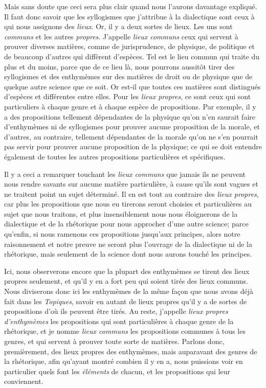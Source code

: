 Mais sans doute que ceci sera plus clair quand nous l'aurons davantage expliqué. Il faut donc savoir que les syllogismes que j'attribue à la dialectique
sont ceux à qui nous assignons des \emph{lieux}. Or, il y a deux sortes de lieux. Les uns sont \emph{communs} et les autres \emph{propres}. J'appelle
\emph{lieux communs} ceux qui servent à prouver diverses matières, comme de jurisprudence, de physique, de politique et de beaucoup d'autres qui diffèrent
d'espèces. Tel est le lieu commun qui traite du plus et du moins, parce que de ce lieu là, nous pourrons aussitôt tirer des syllogismes et des enthymèmes
sur des matières de droit ou de physique que de quelque autre science que ce soit. Or est-il que toutes ces matières sont distingués d'espèces et
différentes entre elles. Pour les \emph{lieux propres}, ce sont ceux qui sont particuliers à chaque genre et à chaque espèce de propositions. Par exemple,
il y a des propositions tellement dépendantes de la physique qu'on n'en saurait faire d'enthymèmes ni de syllogismes pour prouver aucune proposition de la
morale, et d'autres, au contraire, tellement dépendantes de la morale qu'on ne s'en pourrait pas servir pour prouver aucune proposition de la physique; ce
qui se doit entendre également de toutes les autres propositions particulières et spécifiques.

\bigbreak

Il y a ceci a remarquer touchant les \emph{lieux communs} que jamais ils ne peuvent nous rendre savants sur aucune matière particulière, à cause qu'ils
sont vagues et ne traitent point un sujet déterminé. Il en est tout au contraire des \emph{lieux propres}, car plus les propositions que nous eu tirerons
seront choisies et particulières au sujet que nous traitons, et plus insensiblement nous nous éloignerons de la dialectique et de la rhétorique pour nous
approcher d'une autre science; parce qu'enfin, si nous ramenons ces propositions jusqu'aux principes, alors notre raisonnement et notre preuve ne seront
plus l'ouvrage de la dialectique ni de la rhétorique, mais seulement de la science dont nous aurons touché les principes. 

Ici, nous observerons encore que la plupart des enthymèmes se tirent des lieux propres seulement, et qu'il y en a fort peu qui soient tirés des lieux
communs. Nous diviserons donc ici les enthymèmes de la même façon que nous avons déjà fait dans les \emph{Topiques}, savoir en autant de lieux propres
qu'il y a de sortes de  propositions d'où ils peuvent être tirés. Au reste, j'appelle \emph{lieux propres d'enthymèmes} les propositions qui sont
particulières à chaque genre de la rhétorique, et je nomme \emph{lieux communs} les propositions communes à tous les genres, et qui servent à prouver
toute sorte de matières.  Parlons donc, premièrement, des lieux propres des enthymèmes, mais auparavant des genres de la rhétorique, afin qu'ayant montré
combien il y en a, nous puissions voir en particulier quels font les \emph{éléments} de chacun, et les propositions qui leur conviennent.

